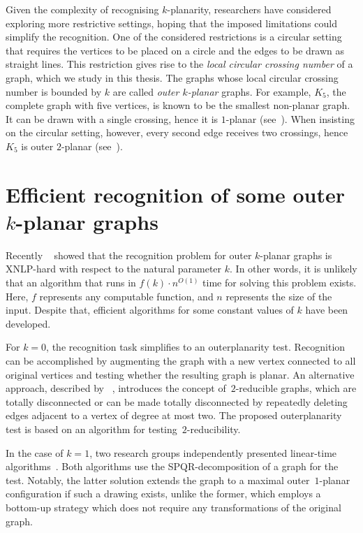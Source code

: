 Given the complexity of recognising \(k\)-planarity, researchers have considered exploring more restrictive settings, hoping that the imposed limitations could simplify the recognition. One of the considered restrictions is a circular setting that requires the vertices to be placed on a circle and the edges to be drawn as straight lines. This restriction gives rise to the \emph{local circular crossing number} of a graph, which we study in this thesis. The graphs whose local circular crossing number is bounded by \(k\) are called \emph{outer \(k\)-planar} graphs. For example, \(K_5\), the complete graph with five vertices, is known to be the smallest non-planar graph. It can be drawn with a single crossing, hence it is \(1\)-planar (see~). When insisting on the circular setting, however, every second edge receives two crossings, hence \(K_5\) is outer \(2\)-planar (see~).


\section{Efficient recognition of some outer \texorpdfstring{\(k\)}{k}-planar graphs}

Recently \citeauthor{okp}~\cite[Theorem 19]{okp} showed that the recognition problem for outer \(k\)-planar graphs is XNLP-hard with respect to the natural parameter \(k\). In other words, it is unlikely that an algorithm that runs in \(f(k)\cdot n^{O(1)}\) time for solving this problem exists. Here, \(f\) represents any computable function, and \(n\) represents the size of the input. Despite that, efficient algorithms for some constant values of \(k\) have been developed.

For \(k = 0\), the recognition task simplifies to an outerplanarity test. Recognition can be accomplished by augmenting the graph with a new vertex connected to all original vertices and testing whether the resulting graph is planar. An alternative approach, described by \citeauthor{linear-op}~\cite{linear-op}, introduces the concept of~\(2\)-reducible graphs, which are totally disconnected or can be made totally disconnected by repeatedly deleting edges adjacent to a vertex of degree at most two. The proposed outerplanarity test is based on an algorithm for testing~\(2\)-reducibility.

In the case of \(k = 1\), two research groups independently presented linear-time algorithms~\cite{linear-o1p_, linear-o1p}. Both algorithms use the SPQR-decomposition of a graph for the test. Notably, the latter solution extends the graph to a maximal outer~\(1\)-planar configuration if such a drawing exists, unlike the former, which employs a bottom-up strategy which does not require any transformations of the original graph.

